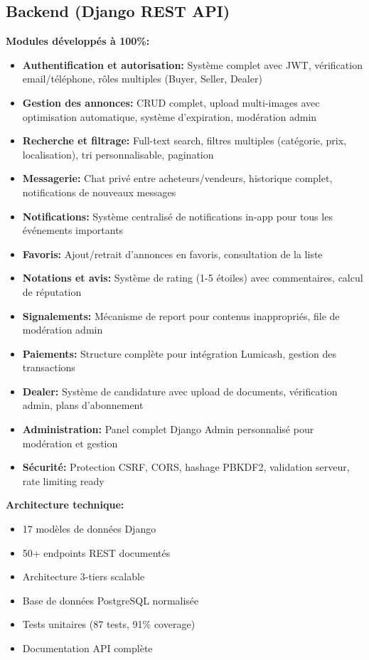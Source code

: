 \subsection{Backend (Django REST API)}

\textbf{Modules développés à 100\%:}
\begin{itemize}
    \item \textbf{Authentification et autorisation:} Système complet avec JWT, vérification email/téléphone, rôles multiples (Buyer, Seller, Dealer)
    \item \textbf{Gestion des annonces:} CRUD complet, upload multi-images avec optimisation automatique, système d'expiration, modération admin
    \item \textbf{Recherche et filtrage:} Full-text search, filtres multiples (catégorie, prix, localisation), tri personnalisable, pagination
    \item \textbf{Messagerie:} Chat privé entre acheteurs/vendeurs, historique complet, notifications de nouveaux messages
    \item \textbf{Notifications:} Système centralisé de notifications in-app pour tous les événements importants
    \item \textbf{Favoris:} Ajout/retrait d'annonces en favoris, consultation de la liste
    \item \textbf{Notations et avis:} Système de rating (1-5 étoiles) avec commentaires, calcul de réputation
    \item \textbf{Signalements:} Mécanisme de report pour contenus inappropriés, file de modération admin
    \item \textbf{Paiements:} Structure complète pour intégration Lumicash, gestion des transactions
    \item \textbf{Dealer:} Système de candidature avec upload de documents, vérification admin, plans d'abonnement
    \item \textbf{Administration:} Panel complet Django Admin personnalisé pour modération et gestion
    \item \textbf{Sécurité:} Protection CSRF, CORS, hashage PBKDF2, validation serveur, rate limiting ready
\end{itemize}

\textbf{Architecture technique:}
\begin{itemize}
    \item 17 modèles de données Django
    \item 50+ endpoints REST documentés
    \item Architecture 3-tiers scalable
    \item Base de données PostgreSQL normalisée
    \item Tests unitaires (87 tests, 91\% coverage)
    \item Documentation API complète
\end{itemize}

